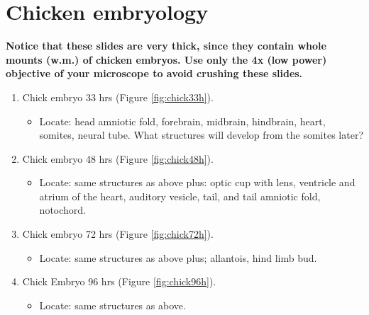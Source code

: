 \documentclass[]{book}
\providecommand{\tightlist}{%
  \setlength{\itemsep}{0pt}\setlength{\parskip}{0pt}}
\theoremstyle{definition}
\theoremstyle{definition}
\theoremstyle{definition}
\theoremstyle{remark}
\let\BeginKnitrBlock\begin \let\EndKnitrBlock\end
\begin{document}
\section{Chicken embryology}\label{chicken-embryology}

\BeginKnitrBlock{rmdcaution}
\textbf{Notice that these slides are very thick, since they contain
whole mounts (w.m.) of chicken embryos. Use only the 4x (low power)
objective of your microscope to avoid crushing these slides.}
\EndKnitrBlock{rmdcaution}

\begin{enumerate}
\def\labelenumi{\arabic{enumi}.}
\tightlist
\item
  Chick embryo 33 hrs (Figure \ref{fig:chick33h}).

\begin{itemize}
\tightlist
  \item
  Locate: head
  amniotic fold, forebrain, midbrain, hindbrain, heart, somites, neural
  tube. What structures will develop from the somites later?
\end{itemize}
\item
  Chick embryo 48 hrs (Figure \ref{fig:chick48h}).
  \begin{itemize}
  \tightlist
    \item
  Locate: same
  structures as above plus: optic cup with lens, ventricle and atrium of
  the heart, auditory vesicle, tail, and tail amniotic fold, notochord.
\end{itemize}
\item
  Chick embryo 72 hrs (Figure \ref{fig:chick72h}).
  \begin{itemize}
  \tightlist
    \item
  Locate: same
  structures as above plus; allantois, hind limb bud.
  \end{itemize}
\item
  Chick Embryo 96 hrs (Figure \ref{fig:chick96h}).
  \begin{itemize}
  \tightlist
    \item
  Locate: same
  structures as above.
  \end{itemize}
\end{enumerate}
\end{document}
